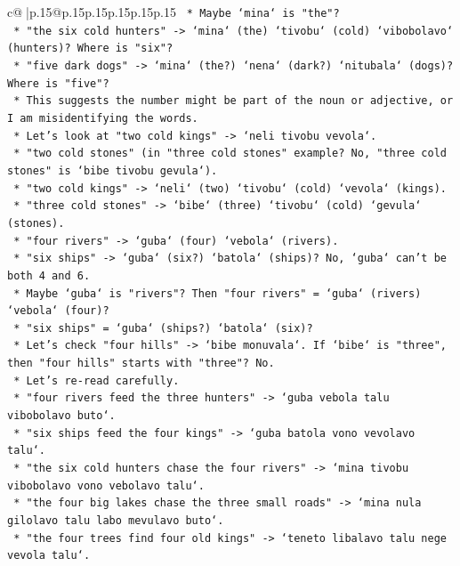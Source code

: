\documentclass{article}
\begin{document}
{\begin{supertabular}{c@{$\;$}|p{.15\linewidth}@{}p{.15\linewidth}p{.15\linewidth}p{.15\linewidth}p{.15\linewidth}p{.15\linewidth}}
{{{\texttt{        *   Maybe `mina` is "the"?} \\
\texttt{        *   "the six cold hunters" {-}> `mina` (the) `tivobu` (cold) `vibobolavo` (hunters)? Where is "six"?} \\
\texttt{        *   "five dark dogs" {-}> `mina` (the?) `nena` (dark?) `nitubala` (dogs)? Where is "five"?} \\
\texttt{        *   This suggests the number might be part of the noun or adjective, or I am misidentifying the words.} \\
\texttt{        *   Let's look at "two cold kings" {-}> `neli tivobu vevola`.} \\
\texttt{        *   "two cold stones" (in "three cold stones" example? No, "three cold stones" is `bibe tivobu gevula`).} \\
\texttt{        *   "two cold kings" {-}> `neli` (two) `tivobu` (cold) `vevola` (kings).} \\
\texttt{        *   "three cold stones" {-}> `bibe` (three) `tivobu` (cold) `gevula` (stones).} \\
\texttt{        *   "four rivers" {-}> `guba` (four) `vebola` (rivers).} \\
\texttt{        *   "six ships" {-}> `guba` (six?) `batola` (ships)? No, `guba` can't be both 4 and 6.} \\
\texttt{        *   Maybe `guba` is "rivers"? Then "four rivers" = `guba` (rivers) `vebola` (four)?} \\
\texttt{        *   "six ships" = `guba` (ships?) `batola` (six)?} \\
\texttt{        *   Let's check "four hills" {-}> `bibe monuvala`. If `bibe` is "three", then "four hills" starts with "three"? No.} \\
\texttt{        *   Let's re{-}read carefully.} \\
\texttt{        *   "four rivers feed the three hunters" {-}> `guba vebola talu vibobolavo buto`.} \\
\texttt{        *   "six ships feed the four kings" {-}> `guba batola vono vevolavo talu`.} \\
\texttt{        *   "the six cold hunters chase the four rivers" {-}> `mina tivobu vibobolavo vono vebolavo talu`.} \\
\texttt{        *   "the four big lakes chase the three small roads" {-}> `mina nula gilolavo talu labo mevulavo buto`.} \\
\texttt{        *   "the four trees find four old kings" {-}> `teneto libalavo talu nege vevola talu`.} \\
}}}
\end{supertabular}}
\end{document}
